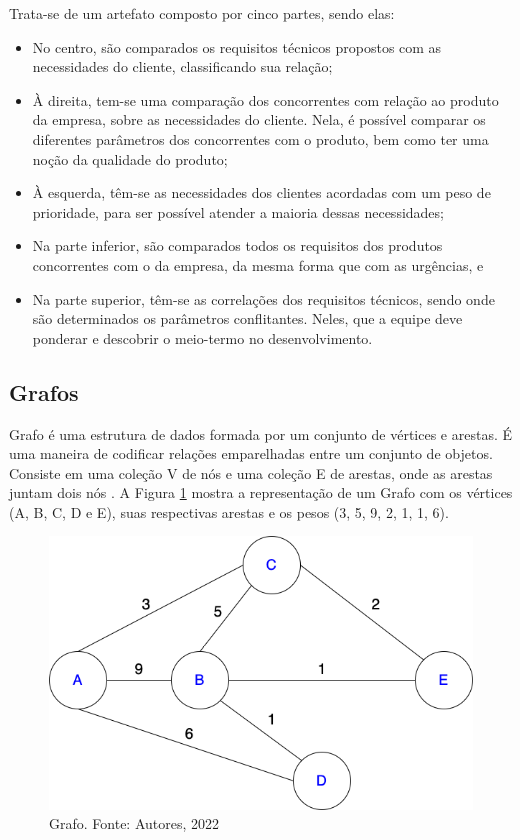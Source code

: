 Trata-se de um artefato composto por cinco partes, sendo elas:

\begin{itemize}
    \item No centro, são comparados os requisitos técnicos propostos com as necessidades do cliente, classificando sua relação;
    \item À direita, tem-se uma comparação dos concorrentes com relação ao produto da empresa, sobre as necessidades do cliente. Nela, é possível comparar os diferentes parâmetros dos concorrentes com o produto, bem como ter uma noção da qualidade do produto;
    \item À esquerda, têm-se as necessidades dos clientes acordadas com um peso de prioridade, para ser possível atender a maioria dessas necessidades;
    \item Na parte inferior, são comparados todos os requisitos dos produtos concorrentes com o da empresa, da mesma forma que com as urgências, e
    \item Na parte superior, têm-se as correlações dos requisitos técnicos, sendo onde são determinados os parâmetros conflitantes. Neles, que a equipe deve ponderar e descobrir o meio-termo no desenvolvimento.
\end{itemize}

\subsection{Grafos}

\label{sec:grafos}

Grafo é uma estrutura de dados formada por um conjunto de vértices e arestas. É uma maneira de codificar relações emparelhadas entre um conjunto de objetos. Consiste em uma coleção V de nós e uma coleção E de arestas, onde as arestas juntam dois nós \cite{Kleinberg+Tardos:06a}. A Figura \ref{grafo_1} mostra a representação de um Grafo com os vértices (A, B, C, D e E), suas respectivas arestas e os pesos (3, 5, 9, 2, 1, 1, 6).

\begin{figure}[H]
    \begin{center}
        \includegraphics[scale=0.45]{figuras/referencial_teorico/Grafo.drawio.png}
        \caption{{Grafo. Fonte: Autores, 2022}}
        \label{grafo_1}
    \end{center}
\end{figure}

